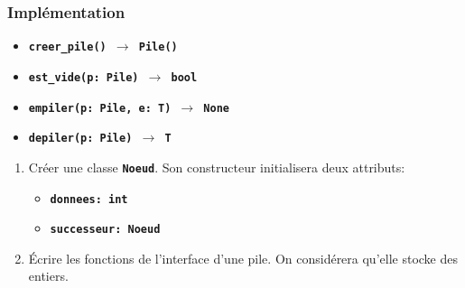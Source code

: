 \documentclass[svgnames,11pt]{beamer}
\begin{document}
\begin{frame}
    \frametitle{Implémentation}
    \begin{itemize}
        \item \texttt{\textbf{creer\_pile() $\rightarrow$ Pile()}}
        \item \texttt{\textbf{est\_vide(p: Pile) $\rightarrow$ bool}}
        \item \texttt{\textbf{empiler(p: Pile, e: T) $\rightarrow$ None}}
        \item \texttt{\textbf{depiler(p: Pile) $\rightarrow$ T}}
    \end{itemize}

    \begin{activite}
        \begin{enumerate}
            \item Créer une classe \textbf{\texttt{Noeud}}. Son constructeur initialisera deux attributs:
                  \begin{itemize}
                      \item \textbf{\texttt{donnees: int}}
                      \item \textbf{\texttt{successeur: Noeud}}
                  \end{itemize}
            \item Écrire les fonctions de l'interface d'une pile. On considérera qu'elle stocke des entiers.
        \end{enumerate}
    \end{activite}

\end{frame}
\end{document}
